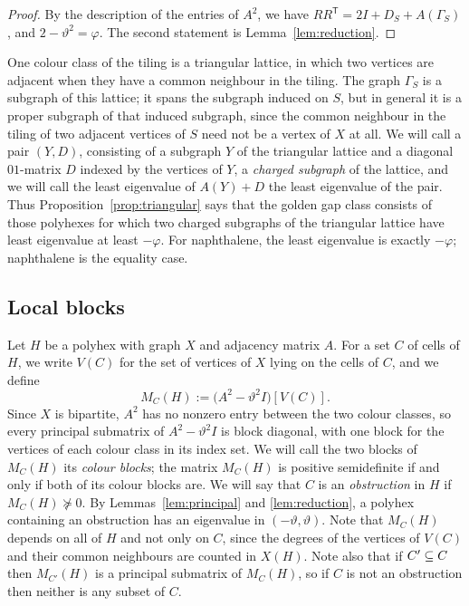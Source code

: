 \documentclass[11pt]{article}
\newcommand\vphi{\varphi}
\newcommand\thetaG{\vartheta}
\newcommand\tp{^{\mathsf T}}
\theoremstyle{definition}
\begin{document}
\begin{proof}
By the description of the entries of $A^2$, we have $RR\tp=2I+D_S+A(\Gamma_S)$,
and $2-\thetaG^2=\vphi$.  The second statement is Lemma~\ref{lem:reduction}.
\end{proof}

One colour class of the tiling is a triangular lattice, in which two vertices
are adjacent when they have a common neighbour in the tiling.  The graph
$\Gamma_S$ is a subgraph of this lattice; it spans the subgraph induced on $S$, but
in general it is a proper subgraph of that induced subgraph, since the common
neighbour in the tiling of two adjacent vertices of $S$ need not be a vertex
of $X$ at all.  We will call a pair $(Y,D)$, consisting of a subgraph $Y$ of
the triangular lattice and a diagonal $01$-matrix $D$ indexed by the vertices
of $Y$, a \textsl{charged subgraph} of the lattice, and we will call the
least eigenvalue of $A(Y)+D$ the least eigenvalue of the pair.  Thus
Proposition~\ref{prop:triangular} says that the golden gap class consists of
those polyhexes for which two charged subgraphs of the triangular lattice
have least eigenvalue at least $-\vphi$.  For naphthalene, the least
eigenvalue is exactly $-\vphi$; naphthalene is the equality case.

\subsection{Local blocks}

Let $H$ be a polyhex with graph $X$ and adjacency matrix $A$.  For a set $C$
of cells of $H$, we write $V(C)$ for the set of vertices of $X$ lying on the
cells of $C$, and we define
\begin{equation}\label{eq:MC}
 M_C(H):=\bigl(A^{2}-\thetaG^{2}I\bigr)[V(C)] .
\end{equation}
Since $X$ is bipartite, $A^{2}$ has no nonzero entry between the two colour
classes, so every principal submatrix of $A^{2}-\thetaG^{2}I$ is block
diagonal, with one block for the vertices of each colour class in its index
set.  We will call the two blocks of $M_C(H)$ its \textsl{colour blocks}; the
matrix $M_C(H)$ is positive semidefinite if and only if both of its colour
blocks are.
We will say that $C$ is an \textsl{obstruction} in $H$ if
$M_C(H)\not\succeq0$.  By Lemmas~\ref{lem:principal} and
\ref{lem:reduction}, a polyhex containing an obstruction has an eigenvalue in
$(-\thetaG,\thetaG)$.  Note that $M_C(H)$ depends on all of $H$ and not only
on $C$, since the degrees of the vertices of $V(C)$ and their common
neighbours are counted in $X(H)$.  Note also that if $C'\subseteq C$ then
$M_{C'}(H)$ is a principal submatrix of $M_C(H)$, so if $C$ is not an
obstruction then neither is any subset of $C$.
\end{document}
